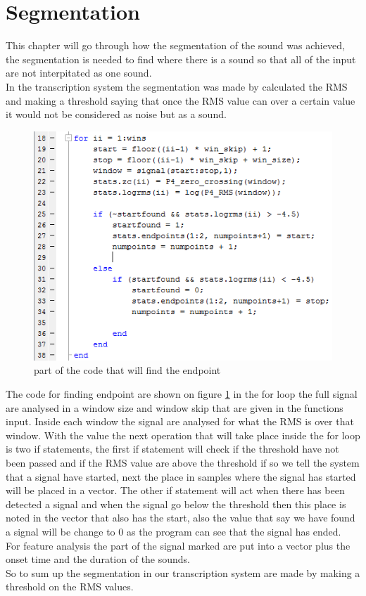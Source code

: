 \section{Segmentation}
This chapter will go through how the segmentation of the sound was achieved, the segmentation is needed to find where there is a sound so that all of the input are not interpitated as one sound.\\
In the transcription system the segmentation was made by calculated the RMS and making a threshold saying that once the RMS value can over a certain value it would not be considered as noise but as a sound. \\
\begin{figure}[h]
	\begin{center}
		\includegraphics[scale =  0.8]{fig/Find_Endpoint_script.png}
		\caption{part of the code that will find the endpoint}
		\label{P4_Findendpoints}
	\end{center}
\end{figure}
The code for finding endpoint are shown on figure \ref{P4_Findendpoints} in the for loop the full signal are analysed in a window size and window skip that are given in the functions input. Inside each window the signal are analysed for what the RMS is over that window. With the value the next operation that will take place inside the for loop is two if statements, the first if statement will check if the threshold have not been passed and if the RMS value are above the threshold if so we tell the system that a signal have started, next the place in samples where the signal has started will be placed in a vector. The other if statement will act when there has been detected a signal and when the signal go below the threshold then this place is noted in the vector that also has the start, also the value that say we have found a signal will be change to 0 as the program can see that the signal has ended.\\
For feature analysis the part of the signal marked are put into a vector plus the onset time and the duration of the sounds.\\
So to sum up the segmentation in our transcription system are made by making a threshold on the RMS values.